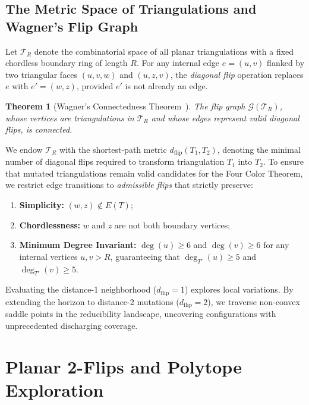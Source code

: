 \documentclass[11pt,a4paper]{article}
\theoremstyle{plain}
\newtheorem{theorem}{Theorem}[section]
\theoremstyle{definition}
\begin{document}
\subsection{The Metric Space of Triangulations and Wagner's Flip Graph}

Let $\mathcal{T}_R$ denote the combinatorial space of all planar triangulations with a fixed chordless boundary ring of length $R$. For any internal edge $e = (u, v)$ flanked by two triangular faces $(u, v, w)$ and $(u, z, v)$, the \emph{diagonal flip} operation replaces $e$ with $e' = (w, z)$, provided $e'$ is not already an edge.

\begin{theorem}[Wagner's Connectedness Theorem~\cite{wagner1936bemerkungen}]
The flip graph $\mathcal{G}(\mathcal{T}_R)$, whose vertices are triangulations in $\mathcal{T}_R$ and whose edges represent valid diagonal flips, is connected.
\end{theorem}

We endow $\mathcal{T}_R$ with the shortest-path metric $d_{\text{flip}}(T_1, T_2)$, denoting the minimal number of diagonal flips required to transform triangulation $T_1$ into $T_2$. To ensure that mutated triangulations remain valid candidates for the Four Color Theorem, we restrict edge transitions to \emph{admissible flips} that strictly preserve:
\begin{enumerate}
    \item \textbf{Simplicity:} $(w, z) \notin E(T)$;
    \item \textbf{Chordlessness:} $w$ and $z$ are not both boundary vertices;
    \item \textbf{Minimum Degree Invariant:} $\deg(u) \ge 6$ and $\deg(v) \ge 6$ for any internal vertices $u, v > R$, guaranteeing that $\deg_{T'}(u) \ge 5$ and $\deg_{T'}(v) \ge 5$.
\end{enumerate}
Evaluating the distance-1 neighborhood ($d_{\text{flip}} = 1$) explores local variations. By extending the horizon to distance-2 mutations ($d_{\text{flip}} = 2$), we traverse non-convex saddle points in the reducibility landscape, uncovering configurations with unprecedented discharging coverage.

\section{Planar 2-Flips and Polytope Exploration}
\end{document}
